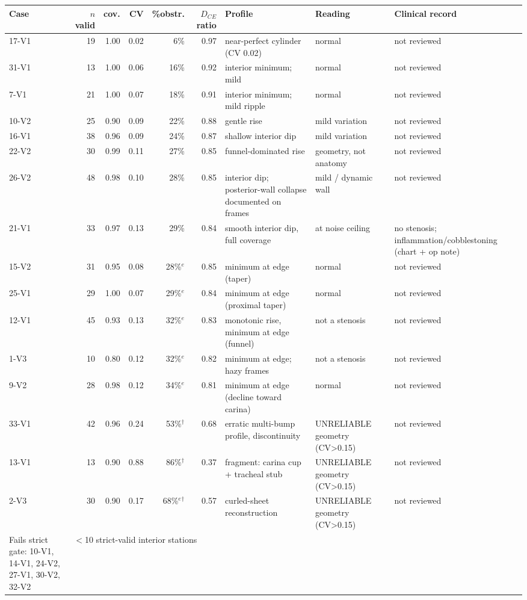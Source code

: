 \begin{tabular}{lrrrrrp{3.3cm}p{2.1cm}p{2.9cm}}
\toprule
Case & $n$ valid & cov. & CV & \%obstr. & $D_{CE}$ ratio & Profile & Reading & Clinical record \\
\midrule
17-V1 & 19 & 1.00 & 0.02 & 6\% & 0.97 & near-perfect cylinder (CV 0.02) & normal & not reviewed \\
31-V1 & 13 & 1.00 & 0.06 & 16\% & 0.92 & interior minimum; mild & normal & not reviewed \\
7-V1 & 21 & 1.00 & 0.07 & 18\% & 0.91 & interior minimum; mild ripple & normal & not reviewed \\
10-V2 & 25 & 0.90 & 0.09 & 22\% & 0.88 & gentle rise & mild variation & not reviewed \\
16-V1 & 38 & 0.96 & 0.09 & 24\% & 0.87 & shallow interior dip & mild variation & not reviewed \\
22-V2 & 30 & 0.99 & 0.11 & 27\% & 0.85 & funnel-dominated rise & geometry, not anatomy & not reviewed \\
26-V2 & 48 & 0.98 & 0.10 & 28\% & 0.85 & interior dip; posterior-wall collapse documented on frames & mild / dynamic wall & not reviewed \\
21-V1 & 33 & 0.97 & 0.13 & 29\% & 0.84 & smooth interior dip, full coverage & at noise ceiling & no stenosis; inflammation/cobblestoning (chart + op note) \\
15-V2 & 31 & 0.95 & 0.08 & 28\%$^{e}$ & 0.85 & minimum at edge (taper) & normal & not reviewed \\
25-V1 & 29 & 1.00 & 0.07 & 29\%$^{e}$ & 0.84 & minimum at edge (proximal taper) & normal & not reviewed \\
12-V1 & 45 & 0.93 & 0.13 & 32\%$^{e}$ & 0.83 & monotonic rise, minimum at edge (funnel) & not a stenosis & not reviewed \\
1-V3 & 10 & 0.80 & 0.12 & 32\%$^{e}$ & 0.82 & minimum at edge; hazy frames & not a stenosis & not reviewed \\
9-V2 & 28 & 0.98 & 0.12 & 34\%$^{e}$ & 0.81 & minimum at edge (decline toward carina) & normal & not reviewed \\
33-V1 & 42 & 0.96 & 0.24 & 53\%$^{\dagger}$ & 0.68 & erratic multi-bump profile, discontinuity & UNRELIABLE geometry (CV>0.15) & not reviewed \\
13-V1 & 13 & 0.90 & 0.88 & 86\%$^{\dagger}$ & 0.37 & fragment: carina cup + tracheal stub & UNRELIABLE geometry (CV>0.15) & not reviewed \\
2-V3 & 30 & 0.90 & 0.17 & 68\%$^{e}$$^{\dagger}$ & 0.57 & curled-sheet reconstruction & UNRELIABLE geometry (CV>0.15) & not reviewed \\
\midrule
Fails strict gate: 10-V1, 14-V1, 24-V2, 27-V1, 30-V2, 32-V2 & \multicolumn{8}{l}{$<$10 strict-valid interior stations} \\
\bottomrule
\end{tabular}
